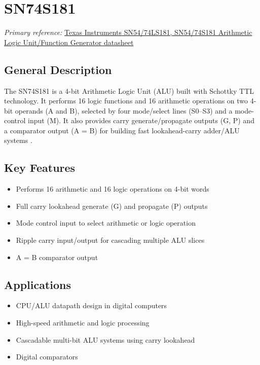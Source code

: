 \documentclass[12pt,a4paper]{report}
\newcommand{\datasheetref}[2]{%
  \noindent\textit{Primary reference:} \href{#2}{#1}%
  \par\vspace{0.6em}
}
\begin{document}
\chapter{SN74S181}
\datasheetref{Texas Instruments SN54/74LS181, SN54/74S181 Arithmetic Logic Unit/Function Generator datasheet}{https://www.ti.com/lit/ds/symlink/sn54ls181.pdf}

\section{General Description}
The SN74S181 is a 4-bit Arithmetic Logic Unit (ALU) built with Schottky
TTL technology. It performs 16 logic functions and 16 arithmetic
operations on two 4-bit operands (A and B), selected by four mode/select
lines (S0--S3) and a mode-control input (M). It also provides carry
generate/propagate outputs (G, P) and a comparator output (A = B) for
building fast lookahead-carry adder/ALU systems \cite{s181}.

\section{Key Features}
\begin{itemize}
  \item Performs 16 arithmetic and 16 logic operations on 4-bit words
  \item Full carry lookahead generate (G) and propagate (P) outputs
  \item Mode control input to select arithmetic or logic operation
  \item Ripple carry input/output for cascading multiple ALU slices
  \item A = B comparator output
\end{itemize}

\section{Applications}
\begin{itemize}
  \item CPU/ALU datapath design in digital computers
  \item High-speed arithmetic and logic processing
  \item Cascadable multi-bit ALU systems using carry lookahead
  \item Digital comparators
\end{itemize}
\end{document}
